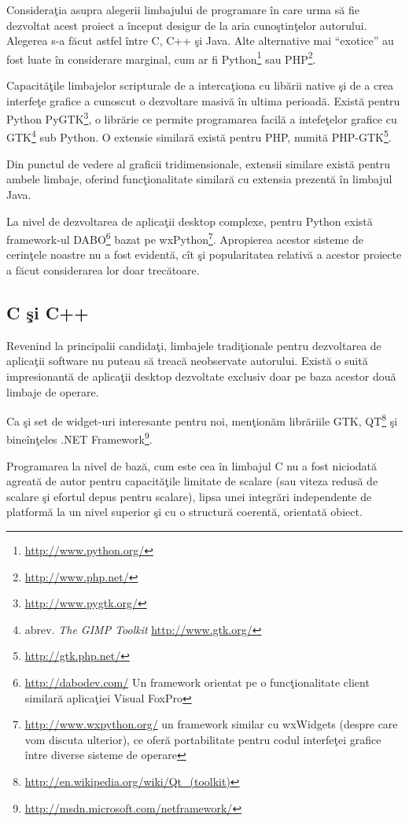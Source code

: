 Consideraţia asupra alegerii limbajului de programare în care urma să fie 
dezvoltat acest proiect a început desigur de la aria cunoştinţelor autorului. 
Alegerea s-a făcut astfel între C, C++ şi Java. Alte alternative mai 
``exotice'' au fost luate în considerare marginal, cum ar fi 
Python\footnote{\url{http://www.python.org/}} sau 
PHP\footnote{\url{http://www.php.net/}}.

Capacităţile limbajelor scripturale de a intercaţiona cu libării native şi de a 
crea interfeţe grafice a cunoscut o dezvoltare masivă în ultima perioadă. 
Există pentru Python PyGTK\footnote{\url{http://www.pygtk.org/}}, o librărie ce 
permite programarea facilă a intefeţelor grafice cu GTK\footnote{abrev. 
\textit{The GIMP Toolkit} \url{http://www.gtk.org/}} sub Python. O extensie 
similară există pentru PHP, numită PHP-GTK\footnote{\url{http://gtk.php.net/}}.

Din punctul de vedere al graficii tridimensionale, extensii similare există 
pentru ambele limbaje, oferind funcţionalitate similară cu extensia prezentă în 
limbajul Java.

La nivel de dezvoltarea de aplicaţii desktop complexe, pentru Python există 
framework-ul DABO\footnote{\url{http://dabodev.com/} Un framework orientat pe o 
funcţionalitate client similară aplicaţiei Visual FoxPro} bazat pe 
wxPython\footnote{\url{http://www.wxpython.org/} un framework similar cu 
wxWidgets (despre care vom discuta ulterior), ce oferă portabilitate pentru 
codul interfeţei grafice între diverse sisteme de operare}. Apropierea acestor 
sisteme de cerinţele noastre nu a fost evidentă, cît şi popularitatea relativă 
a acestor proiecte a făcut considerarea lor doar trecătoare.

\subsection{C şi C++}

Revenind la principalii candidaţi, limbajele tradiţionale pentru dezvoltarea de 
aplicaţii software nu puteau să treacă neobservate autorului. Există o suită 
impresionantă de aplicaţii desktop dezvoltate exclusiv doar pe baza acestor 
două limbaje de operare.

Ca şi set de widget-uri interesante pentru noi, menţionăm librăriile GTK, 
QT\footnote{\url{http://en.wikipedia.org/wiki/Qt_(toolkit)}} şi bineînţeles 
.NET Framework\footnote{\url{http://msdn.microsoft.com/netframework/}}.

Programarea la nivel de bază, cum este cea în limbajul C nu a fost niciodată 
agreată de autor pentru capacităţile limitate de scalare (sau viteza redusă de 
scalare şi efortul depus pentru scalare), lipsa unei integrări independente de 
platformă la un nivel superior şi cu o structură coerentă, orientată obiect.

